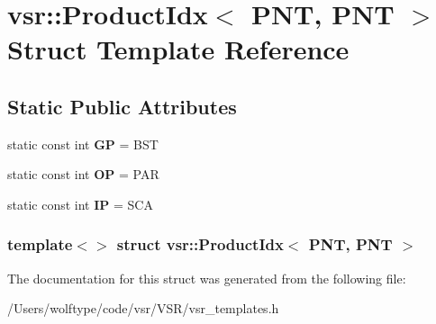 \hypertarget{structvsr_1_1_product_idx_3_01_p_n_t_00_01_p_n_t_01_4}{\section{vsr\-:\-:Product\-Idx$<$ P\-N\-T, P\-N\-T $>$ Struct Template Reference}
\label{structvsr_1_1_product_idx_3_01_p_n_t_00_01_p_n_t_01_4}
}
\subsection*{Static Public Attributes}
\begin{DoxyCompactItemize}
\item 
\hypertarget{structvsr_1_1_product_idx_3_01_p_n_t_00_01_p_n_t_01_4_a93f06cec4f24bf2acc7627cd03d02d70}{static const int {\bfseries G\-P} = B\-S\-T}\label{structvsr_1_1_product_idx_3_01_p_n_t_00_01_p_n_t_01_4_a93f06cec4f24bf2acc7627cd03d02d70}

\item 
\hypertarget{structvsr_1_1_product_idx_3_01_p_n_t_00_01_p_n_t_01_4_a88570a734465eb519ad0823f96928b02}{static const int {\bfseries O\-P} = P\-A\-R}\label{structvsr_1_1_product_idx_3_01_p_n_t_00_01_p_n_t_01_4_a88570a734465eb519ad0823f96928b02}

\item 
\hypertarget{structvsr_1_1_product_idx_3_01_p_n_t_00_01_p_n_t_01_4_a53ef20a5af8bd82fc5b628070e6b8099}{static const int {\bfseries I\-P} = S\-C\-A}\label{structvsr_1_1_product_idx_3_01_p_n_t_00_01_p_n_t_01_4_a53ef20a5af8bd82fc5b628070e6b8099}

\end{DoxyCompactItemize}
\subsubsection*{template$<$$>$ struct vsr\-::\-Product\-Idx$<$ P\-N\-T, P\-N\-T $>$}



The documentation for this struct was generated from the following file\-:\begin{DoxyCompactItemize}
\item 
/\-Users/wolftype/code/vsr/\-V\-S\-R/vsr\-\_\-templates.\-h\end{DoxyCompactItemize}
